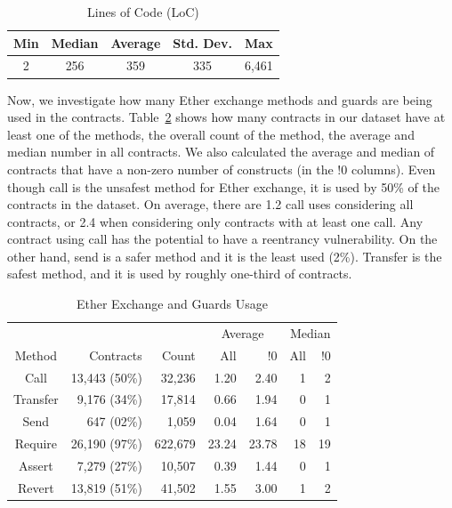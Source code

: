 \documentclass[10pt,conference]{IEEEtran}
\begin{document}
\begin{table}
\center
  \caption{Lines of Code (LoC)}
  \label{tab:loc}
  \begin{tabular}{c c c c c}
    \hline
    Min & Median & Average & Std. Dev. & Max \\
    \hline
   2 & 256 & 359 & 335 & 6,461 \\
  \hline
\end{tabular}
\end{table}

Now, we investigate how many Ether exchange methods and guards are being used in the contracts. Table~\ref{tab:results-all} shows how many contracts in our dataset have at least one of the methods, the overall count of the method, the average and median number in all contracts. We also calculated the average and median of contracts that have a non-zero number of constructs (in the !0 columns). Even though call is the unsafest method for Ether exchange, it is used by 50\% of the contracts in the dataset. On average, there are 1.2 call uses considering all contracts, or 2.4 when considering only contracts with at least one call. Any contract using call has the potential to have a reentrancy vulnerability. On the other hand, send is a safer method and it is the least used (2\%). Transfer is the safest method, and it is used by roughly one-third of contracts.

\begin{table}
\center
  \caption{Ether Exchange and Guards Usage}
  \label{tab:results-all}
  \begin{tabular}{crrrr r r}
    \hline
     &  & &  \multicolumn{2}{c}{Average} & \multicolumn{2}{c}{Median} \\
    Method & Contracts & Count & All & !0 & All & !0 \\ 
    \hline
    Call & 13,443 (50\%) & 32,236 & 1.20 & 2.40 & 1 & 2 \\
    Transfer & 9,176 (34\%) & 17,814 & 0.66 & 1.94 & 0 & 1\\
    Send & 647 (02\%) & 1,059& 0.04 & 1.64 & 0 & 1\\
    Require & 26,190 (97\%) & 622,679 & 23.24 & 23.78 & 18 & 19 \\
    Assert & 7,279 (27\%) & 10,507 & 0.39 & 1.44  & 0 & 1\\
    Revert & 13,819 (51\%) & 41,502 & 1.55 & 3.00 & 1 & 2\\
    \hline
\end{tabular}
\end{table}
\end{document}
